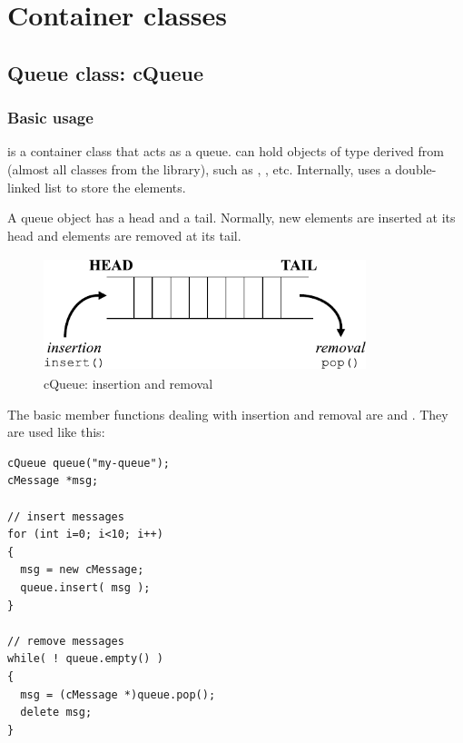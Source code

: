 \section{Container classes}

\subsection{Queue class: cQueue}

\subsubsection{Basic usage}


 is a container class that acts as a queue.
 can hold objects of type derived from 
(almost all classes from the {\opp} library), such as
, , etc. Internally, 
uses a double-linked list to store the elements.

A queue object has a head and a tail. Normally, new elements
are inserted at its head and elements are removed at its tail.


\begin{figure}[htbp]
  \begin{center}
    \includegraphics[width=3.703in, height=1.303in]{figures/usmanFig10}
    \caption{cQueue: insertion and removal}
    \label{fig:ch-sim-lib:cqueue}
  \end{center}
\end{figure}

The basic  member functions dealing with insertion and removal
are  and . They are used
like this:

\begin{verbatim}
cQueue queue("my-queue");
cMessage *msg;

// insert messages
for (int i=0; i<10; i++)
{
  msg = new cMessage;
  queue.insert( msg );
}

// remove messages
while( ! queue.empty() )
{
  msg = (cMessage *)queue.pop();
  delete msg;
}
\end{verbatim}



